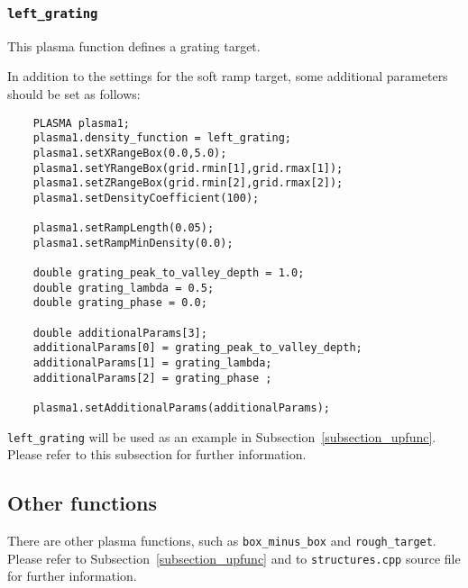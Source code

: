 \documentclass[11pt,a4paper]{report}
\begin{document}
\subsubsection{\texttt{left\_grating}}
This plasma function defines a grating target.

In addition to the settings for the soft ramp target, some additional parameters should be set as follows:
\begin{lstlisting}
	PLASMA plasma1;
	plasma1.density_function = left_grating;
	plasma1.setXRangeBox(0.0,5.0);
	plasma1.setYRangeBox(grid.rmin[1],grid.rmax[1]);
	plasma1.setZRangeBox(grid.rmin[2],grid.rmax[2]);
	plasma1.setDensityCoefficient(100);

	plasma1.setRampLength(0.05);
	plasma1.setRampMinDensity(0.0);

	double grating_peak_to_valley_depth = 1.0;
	double grating_lambda = 0.5;
	double grating_phase = 0.0;

	double additionalParams[3];
	additionalParams[0] = grating_peak_to_valley_depth;
	additionalParams[1] = grating_lambda;
	additionalParams[2] = grating_phase ;

	plasma1.setAdditionalParams(additionalParams);
\end{lstlisting}
\verb+left_grating+ will be used as an example in Subsection~\ref{subsection_upfunc}. Please refer to this subsection for further information.


\subsection{Other functions}
There are other plasma functions, such as \texttt{box\_minus\_box} and \texttt{rough\_target}. Please refer to Subsection~\ref{subsection_upfunc} and to \verb+structures.cpp+ source file for further information.
\end{document}

